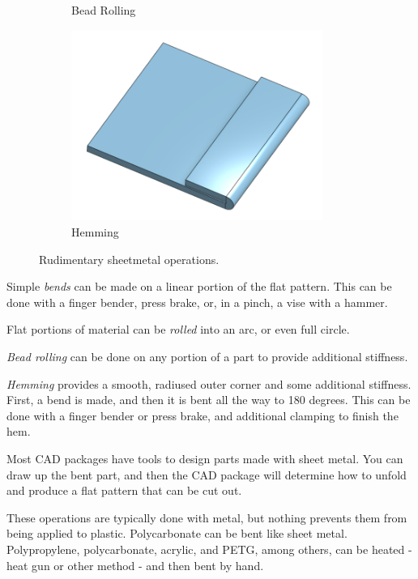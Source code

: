 \documentclass[10pt,letterpaper]{book}
\begin{document}
\begin{figure}[H]
\begin{subfigure}[b]{.24\linewidth}
			\caption{Bead Rolling}
		\end{subfigure}\begin{subfigure}[b]{.24\linewidth}
			\includegraphics[width=0.9\textwidth]{imgs/sheet_hem.png}
			\caption{Hemming}
		\end{subfigure}
		\caption{Rudimentary sheetmetal operations.}
	\end{figure} 
 
 \begin{asparaenum}[a)]
 	\item Simple \textit{bends} can be made on a linear portion of the flat pattern. This can be done with a finger bender, press brake, or, in a pinch, a vise with a hammer.
 	\item Flat portions of material can be \textit{rolled} into an arc, or even full circle.
 	\item \textit{Bead rolling} can be done on any portion of a part to provide additional stiffness.	
 	\item \textit{Hemming} provides a smooth, radiused outer corner and some additional stiffness. First, a bend is made, and then it is bent all the way to 180 degrees. This can be done with a finger bender or press brake, and additional clamping to finish the hem.
 	\end{asparaenum}
 	
 	Most CAD packages have tools to design parts made with sheet metal. You can draw up the bent part, and then the CAD package will determine how to unfold and produce a flat pattern that can be cut out.
 	
 	These operations are typically done with metal, but nothing prevents them from being applied to plastic. Polycarbonate can be bent like sheet metal. Polypropylene, polycarbonate, acrylic, and PETG, among others, can be heated - heat gun or other method - and then bent by hand.
 	
\end{document}
